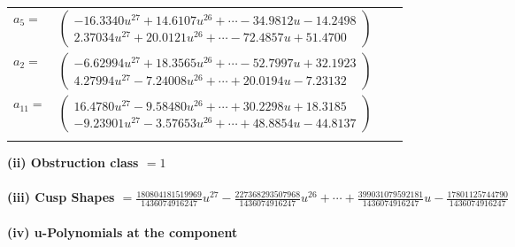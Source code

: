 \documentclass[1p]{elsarticle_modified}
\theoremstyle{definition}
\begin{document}
\begin{tabular}{m{7pt} m{180pt} m{7pt} m{180pt} }
\flushright $a_{5}=$&$\begin{pmatrix}-16.3340 u^{27}+14.6107 u^{26}+\cdots-34.9812 u-14.2498\\2.37034 u^{27}+20.0121 u^{26}+\cdots-72.4857 u+51.4700\end{pmatrix}$ \\
\flushright $a_{2}=$&$\begin{pmatrix}-6.62994 u^{27}+18.3565 u^{26}+\cdots-52.7997 u+32.1923\\4.27994 u^{27}-7.24008 u^{26}+\cdots+20.0194 u-7.23132\end{pmatrix}$ \\
\flushright $a_{11}=$&$\begin{pmatrix}16.4780 u^{27}-9.58480 u^{26}+\cdots+30.2298 u+18.3185\\-9.23901 u^{27}-3.57653 u^{26}+\cdots+48.8854 u-44.8137\end{pmatrix}$\\&\end{tabular}
\flushleft \textbf{(ii) Obstruction class $= 1$}\\~\\
\flushleft \textbf{(iii) Cusp Shapes $= \frac{180804181519969}{1436074916247} u^{27}-\frac{227368293507968}{1436074916247} u^{26}+\cdots+\frac{399031079592181}{1436074916247} u-\frac{17801125744790}{1436074916247}$}\\~\\
\newpage\renewcommand{\arraystretch}{1}
\flushleft \textbf{(iv) u-Polynomials at the component}\newline \\
\end{document}
